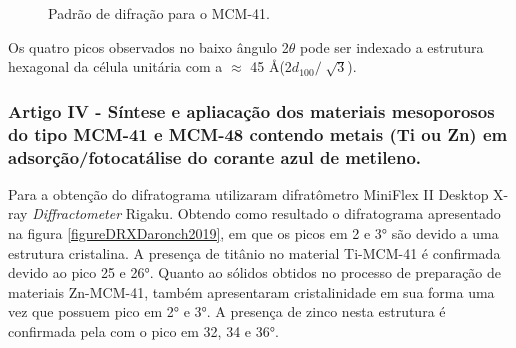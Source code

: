 \begin{figure}[ht]
    \center
    \begin{minipage}{10cm}
     \caption{Padrão de difração para o MCM-41.}\label{figureXRDkresge1992} 
     \end{minipage}
\end{figure}

Os quatro picos observados no baixo ângulo 2$\theta$ pode ser indexado a estrutura
hexagonal da célula unitária com a $\approx$ 45 \AA (2$d_{100}/\sqrt[]{3}$).

\subsubsection*{\textbf{Artigo IV} - Síntese e apliacação dos materiais mesoporosos do tipo MCM-41 e
MCM-48 contendo metais (Ti ou Zn) em adsorção/fotocatálise do
corante azul de metileno.}

Para a obtenção do difratograma  utilizaram difratômetro
MiniFlex II Desktop X-ray \textit{Diffractometer} Rigaku. Obtendo como resultado o difratograma
apresentado na figura \ref{figureDRXDaronch2019}, em que os picos em 2 e 3° são devido
a uma estrutura cristalina. A presença de titânio no material Ti-MCM-41 é confirmada
devido ao pico 25 e 26°. Quanto ao sólidos obtidos no processo de preparação de materiais
Zn-MCM-41, também apresentaram cristalinidade em sua forma uma vez que possuem pico em 2° e 3°.
A presença de zinco nesta estrutura é confirmada pela com o pico em 32, 34 e 36°.

